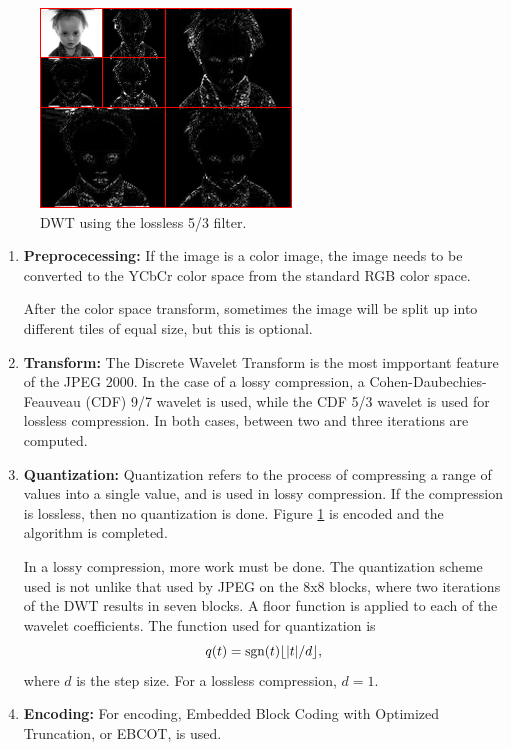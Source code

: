 \documentclass[titlepage,12pt]{article}
\DeclarePairedDelimiter\floor{\lfloor}{\rfloor}
\DeclareMathOperator{\sgn}{sgn}
\begin{document}
\begin{figure}[h]
	\centering
	\includegraphics[scale=0.6]{resources/losslessbaby.png}
	\caption{DWT using the lossless 5/3 filter.}
	\label{fig:losslessbaby}
\end{figure}

\begin{enumerate}
	
	\item\textbf{Preprocecessing:}
	If the image is a color image, the image needs to be converted to the YCbCr color space\cite{colorspace}
	from the standard RGB color space.

	After the color space transform, sometimes the image will be split up into different tiles of equal size,
	but this is optional.
	
	\item\textbf{Transform:}
	The Discrete Wavelet Transform is the most impportant feature of the JPEG 2000.
	In the case of a lossy compression, a Cohen-Daubechies-Feauveau (CDF) 9/7 wavelet is used,
	while the CDF 5/3 wavelet is used for lossless compression.
	In both cases, between two and three iterations are computed.
	
	\item\textbf{Quantization:}
	Quantization refers to the process of compressing a range of values into a single value,
	and is used in lossy compression.
	If the compression is lossless, then no quantization is done.
	Figure \ref{fig:losslessbaby} is encoded and the algorithm is completed.
	
	In a lossy compression, more work must be done.
	The quantization scheme used is not unlike that used by JPEG on the 8x8 blocks,
	where two iterations of the DWT results in seven blocks.
	A floor function is applied to each of the wavelet coefficients.
	The function used for quantization is
	\begin{equation}
		q(t) = \sgn(t)\floor*{|t|/d},
	\end{equation}
	where $d$ is the step size.\cite{whydomath}
	For a lossless compression, $d=1$.
	
	\item\textbf{Encoding:}
	For encoding, Embedded Block Coding with Optimized Truncation, or EBCOT, is used.
	
\end{enumerate}
\end{document}
